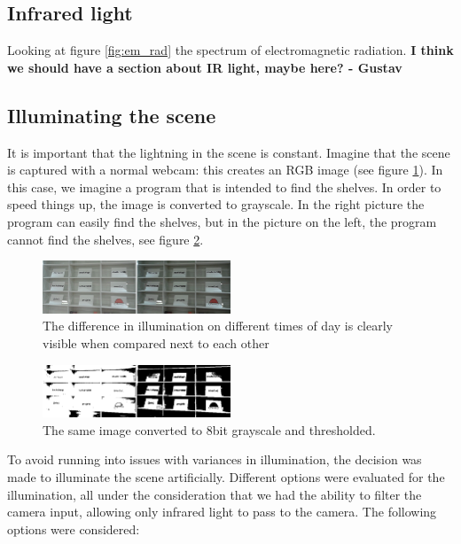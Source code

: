 \subsection{Infrared light}

Looking at figure \ref{fig:em_rad} the spectrum of electromagnetic radiation. 
\textbf{I think we should have a section about IR light, maybe here? - Gustav}

\subsection{Illuminating the scene}

It is important that the lightning in the scene is constant. Imagine that the scene is captured with a normal webcam: this creates an RGB image (see figure \ref{fig:scene_light}). In this case, we imagine a program that is intended to find the shelves. In order to speed things up, the image is converted to grayscale. In the right picture the program can easily find the shelves, but in the picture on the left, the program cannot find the shelves, see figure \ref{fig:scene_thresholded}.

\begin{figure}[htbp] 
\centering 
\includegraphics[width=0.5\textwidth]{Pictures/HjoerringLibrary/scene_lighting.png} 
\caption{The difference in illumination on different times of day is clearly visible when compared next to each other} 
\label{fig:scene_light} 
\end{figure}

\begin{figure}[htbp] 
\centering 
\includegraphics[width=0.5\textwidth]{Pictures/HjoerringLibrary/scene_lighting_thresholded.png} 
\caption{The same image converted to 8bit grayscale and thresholded.} 
\label{fig:scene_thresholded} 
\end{figure}

To avoid running into issues with variances in illumination, the decision was made to illuminate the scene artificially. Different options were evaluated for the illumination, all under the consideration that we had the ability to filter the camera input, allowing only infrared light to pass to the camera. The following options were considered:

